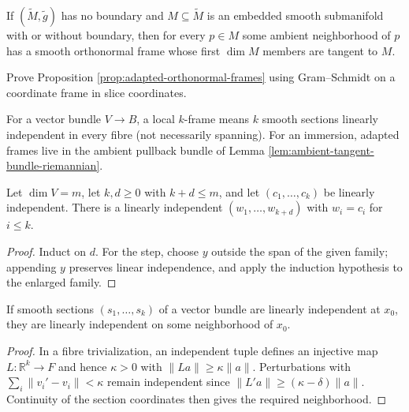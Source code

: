 \begin{proposition}
\label{prop:adapted-orthonormal-frames}
If $(\widetilde M,\widetilde g)$ has no boundary and $M\subseteq\widetilde M$ is an embedded smooth submanifold with or without boundary, then for every $p\in M$ some ambient neighborhood of $p$ has a smooth orthonormal frame whose first $\dim M$ members are tangent to $M$.
\end{proposition}
\begin{exercise}
\label{exer:gram-schmidt-adapted-frame}
Prove Proposition \ref{prop:adapted-orthonormal-frames} using Gram--Schmidt on a coordinate frame in slice coordinates.
\end{exercise}

For a vector bundle $V\to B$, a local $k$-frame means $k$ smooth sections linearly independent in every fibre (not necessarily spanning). For an immersion, adapted frames live in the ambient pullback bundle of Lemma \ref{lem:ambient-tangent-bundle-riemannian}.

\begin{lemma}
\label{lem:ordered-linear-extension}
\leanok
Let $\dim V=m$, let $k,d\ge0$ with $k+d\le m$, and let $(c_1,\ldots,c_k)$ be linearly independent. There is a linearly independent $(w_1,\ldots,w_{k+d})$ with $w_i=c_i$ for $i\le k$.
\end{lemma}
\begin{proof}
\leanok
\sketch Induct on $d$. For the step, choose $y$ outside the span of the given family; appending $y$ preserves linear independence, and apply the induction hypothesis to the enlarged family.
\end{proof}

\begin{lemma}
\label{lem:open-linear-independence}
\leanok
If smooth sections $(s_1,\ldots,s_k)$ of a vector bundle are linearly independent at $x_0$, they are linearly independent on some neighborhood of $x_0$.
\end{lemma}
\begin{proof}
\leanok
\sketch In a fibre trivialization, an independent tuple defines an injective map $L:\mathbb R^k\to F$ and hence $\kappa>0$ with $\|La\|\ge\kappa\|a\|$. Perturbations with $\sum_i\|v_i'-v_i\|<\kappa$ remain independent since $\|L'a\|\ge(\kappa-\delta)\|a\|$. Continuity of the section coordinates then gives the required neighborhood.
\end{proof}


